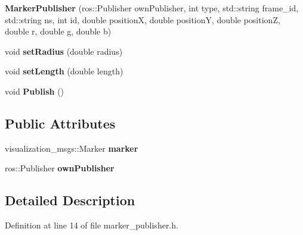 \begin{DoxyCompactItemize}
\item 
{\bfseries Marker\+Publisher} (ros\+::\+Publisher own\+Publisher, int type, std\+::string frame\+\_\+id, std\+::string ns, int id, double positionX, double positionY, double positionZ, double r, double g, double b)\hypertarget{class_marker_publisher_a23ac3c5daec917a0420cfd6e6987a9da}{}\label{class_marker_publisher_a23ac3c5daec917a0420cfd6e6987a9da}

\item 
void {\bfseries set\+Radius} (double radius)\hypertarget{class_marker_publisher_a4eef35fa99fc45e44d7e66623ded27fe}{}\label{class_marker_publisher_a4eef35fa99fc45e44d7e66623ded27fe}

\item 
void {\bfseries set\+Length} (double length)\hypertarget{class_marker_publisher_a89ea91904c86ad63b73d353edc2c9c52}{}\label{class_marker_publisher_a89ea91904c86ad63b73d353edc2c9c52}

\item 
void {\bfseries Publish} ()\hypertarget{class_marker_publisher_acbaf9e788aab5b7ae58794f4dbdea6ee}{}\label{class_marker_publisher_acbaf9e788aab5b7ae58794f4dbdea6ee}

\end{DoxyCompactItemize}
\subsection*{Public Attributes}
\begin{DoxyCompactItemize}
\item 
visualization\+\_\+msgs\+::\+Marker {\bfseries marker}\hypertarget{class_marker_publisher_a745ce239c73581fcbf4af21cbcb230bd}{}\label{class_marker_publisher_a745ce239c73581fcbf4af21cbcb230bd}

\item 
ros\+::\+Publisher {\bfseries own\+Publisher}\hypertarget{class_marker_publisher_a04b650a8fa02fb604a55d4adf396a5b0}{}\label{class_marker_publisher_a04b650a8fa02fb604a55d4adf396a5b0}

\end{DoxyCompactItemize}


\subsection{Detailed Description}


Definition at line 14 of file marker\+\_\+publisher.\+h.



